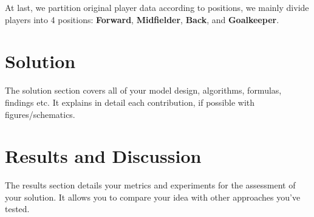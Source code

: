 \documentclass{article}
\begin{document}
At last, we partition original player data according to positions, we mainly divide players into 4 positions: \textbf{Forward}, \textbf{Midfielder}, \textbf{Back}, and \textbf{Goalkeeper}.

\section*{Solution}

The solution section covers all of your model design, algorithms, formulas, findings etc. It explains in detail each contribution, if possible with figures/schematics.




\section*{Results and Discussion}
The results section details your metrics and experiments for the assessment of your solution. It allows you to compare your idea with other approaches you've tested. 

\nocite{*}


\end{document}
